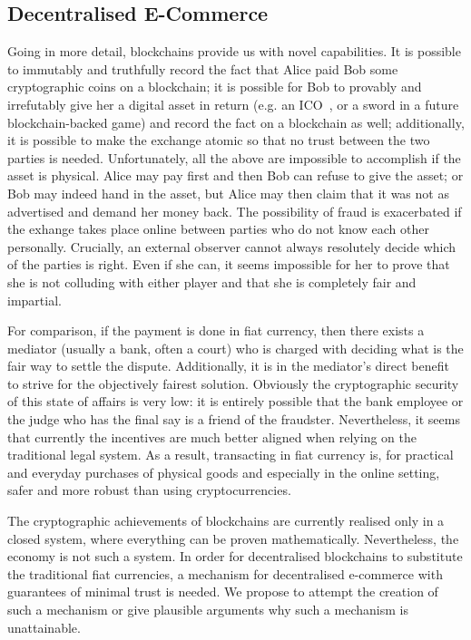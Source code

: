 \subsection{Decentralised E-Commerce}
  Going in more detail, blockchains provide us with novel capabilities. It is possible to
  immutably and truthfully record the fact that Alice paid Bob some cryptographic coins on
  a blockchain; it is possible for Bob to provably and irrefutably give her a digital
  asset in return (e.g. an ICO~\cite{eos}, or a sword in a future blockchain-backed game)
  and record the fact on a blockchain as well; additionally, it is possible to make the
  exchange atomic so that no trust between the two parties is needed. Unfortunately, all
  the above are impossible to accomplish if the asset is physical. Alice may pay first and
  then Bob can refuse to give the asset; or Bob may indeed hand in the asset, but Alice
  may then claim that it was not as advertised and demand her money back. The possibility
  of fraud is exacerbated if the exhange takes place online between parties who do not
  know each other personally. Crucially, an external observer cannot always resolutely
  decide which of the parties is right. Even if she can, it seems impossible for her to
  prove that she is not colluding with either player and that she is completely fair and
  impartial.

  For comparison, if the payment is done in fiat currency, then there exists a mediator
  (usually a bank, often a court) who is charged with deciding what is the fair way to
  settle the dispute. Additionally, it is in the mediator's direct benefit to strive for
  the objectively fairest solution. Obviously the cryptographic security of this state of
  affairs is very low: it is entirely possible that the bank employee or the judge who has
  the final say is a friend of the fraudster. Nevertheless, it seems that currently the
  incentives are much better aligned when relying on the traditional legal system. As a
  result, transacting in fiat currency is, for practical and everyday purchases of
  physical goods and especially in the online setting, safer and more robust than using
  cryptocurrencies.

  The cryptographic achievements of blockchains are currently realised only in a closed
  system, where everything can be proven mathematically. Nevertheless, the economy is not
  such a system. In order for decentralised blockchains to substitute the traditional fiat
  currencies, a mechanism for decentralised e-commerce with guarantees of minimal trust is
  needed. We propose to attempt the creation of such a mechanism or give plausible
  arguments why such a mechanism is unattainable.
